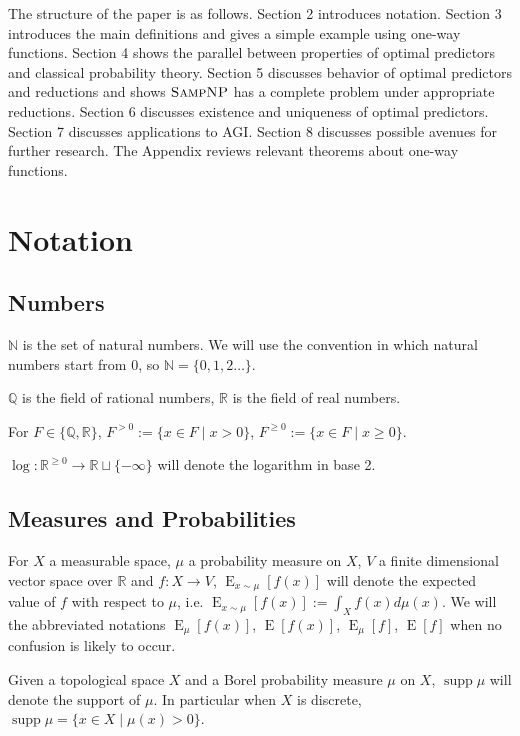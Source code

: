 \documentclass{article}
\theoremstyle{definition}
\theoremstyle{plain}
\DeclareMathOperator{\Supp}{supp}
\DeclareMathOperator{\E}{E}
\newcommand{\Nats}{\mathbb{N}}
\newcommand{\Rats}{\mathbb{Q}}
\newcommand{\Reals}{\mathbb{R}}
\begin{document}
The structure of the paper is as follows. Section 2 introduces notation. Section 3 introduces the main definitions and gives a simple example using one-way functions. Section 4 shows the parallel between properties of optimal predictors and classical probability theory. Section 5 discusses behavior of optimal predictors and reductions and shows $\textsc{SampNP}$ has a complete problem under appropriate reductions. Section 6 discusses existence and uniqueness of optimal predictors. Section 7 discusses applications to AGI. Section 8 discusses possible avenues for further research. The Appendix reviews relevant theorems about one-way functions.

\setcounter{section}{-1}

\section{Notation}
%
\subsection{Numbers}

$\Nats$ is the set of natural numbers. We will use the convention in which natural numbers start from 0, so $\Nats = \{0, 1, 2 \ldots \}$. 

$\Rats$ is the field of rational numbers, $\Reals$ is the field of real numbers.

For $F \in \{\Rats,\Reals\}$, $F^{>0} := \{x \in F \mid x > 0\}$, $F^{\geq 0} := \{x \in F \mid x \geq 0\}$.

$\log: \Reals^{\geq 0} \rightarrow \Reals \sqcup \{-\infty\}$ will denote the logarithm in base 2.

\subsection{Measures and Probabilities}

For $X$ a measurable space, $\mu$ a probability measure on $X$, $V$ a finite dimensional vector space over $\Reals$ and $f: X \rightarrow V$, $\E_{x \sim \mu}[f(x)]$ will denote the expected value of $f$ with respect to $\mu$, i.e. $\E_{x \sim \mu}[f(x)] := \int_X f(x) d\mu(x)$. We will the abbreviated notations $\E_\mu[f(x)]$, $\E[f(x)]$, $\E_\mu[f]$, $\E[f]$ when no confusion is likely to occur.

Given a topological space $X$ and a Borel probability measure $\mu$ on $X$, $\Supp \mu$ will denote the support of $\mu$. In particular when $X$ is discrete, ${\Supp \mu = \{x \in X \mid \mu(x) > 0\}}$.
\end{document}
